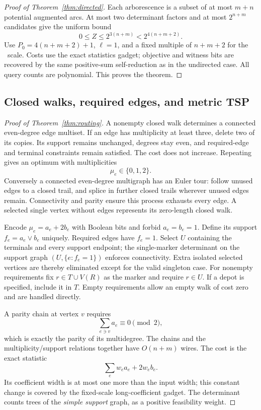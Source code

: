 \begin{proof}[Proof of Theorem~\ref{thm:directed}]
Each arborescence is a subset of at most $m+n$ potential augmented
arcs. At most two determinant factors and at most $2^{n+m}$
candidates give the uniform bound
\[
 0\le Z\le2^{3(n+m)}<2^{4(n+m+2)}.
\]
Use $P_0=4(n+m+2)+1$, $\ell=1$, and a fixed multiple of $n+m+2$
for the \HTC\ scale. Costs use the exact statistics gadget; objective
and witness bits are recovered by the same positive-sum self-reduction
as in the undirected case. All query counts are polynomial. This
proves the theorem.
\end{proof}

\subsection{Closed walks, required edges, and metric TSP}

\begin{proof}[Proof of Theorem~\ref{thm:routing}]
A nonempty closed walk determines a connected even-degree edge
multiset. If an edge has multiplicity at least three, delete two of
its copies. Its support remains unchanged, degrees stay even, and
required-edge and terminal constraints remain satisfied. The cost
does not increase. Repeating gives an optimum with multiplicities
\begin{equation}\label{eq:walk-multiplicity}
 \mu_e\in\{0,1,2\}.
\end{equation}
Conversely a connected even-degree multigraph has an Euler tour:
follow unused edges to a closed trail, and splice in further closed
trails wherever unused edges remain. Connectivity and parity ensure
this process exhausts every edge. A selected single vertex without
edges represents its zero-length closed walk.

Encode $\mu_e=a_e+2b_e$ with Boolean bits and forbid $a_e=b_e=1$.
Define its support $f_e=a_e\vee b_e$ uniquely. Required edges have
$f_e=1$. Select $U$ containing the terminals and every support
endpoint; the single-marker determinant on the support graph
$(U,\{e:f_e=1\})$ enforces connectivity. Extra isolated selected
vertices are thereby eliminated except for the valid singleton case.
For nonempty requirements fix
$r\in T\cup V(R)$ as the marker and require $r\in U$. If a depot is
specified, include it in $T$. Empty requirements allow an empty walk
of cost zero and are handled directly.

A parity chain at vertex $v$ requires
\[
 \sum_{e\ni v}a_e\equiv0\pmod2,
\]
which is exactly the parity of its multidegree. The chains and the
multiplicity/support relations together have $O(n+m)$ wires. The
cost is the exact statistic
\[
 \sum_e w_ea_e+2w_eb_e.
\]
Its coefficient width is at most one more than the input width;
this constant change is covered by the fixed-scale long-coefficient
gadget. The determinant counts trees of the \emph{simple support}
graph, as a positive feasibility weight.


\end{proof}
